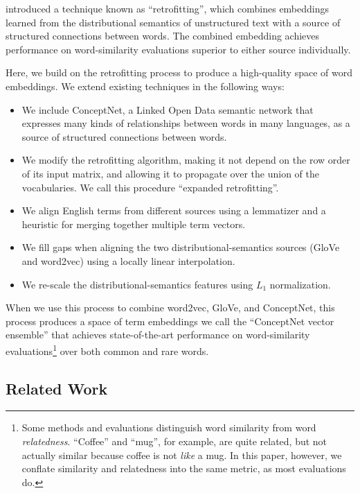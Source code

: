 \documentclass[11pt,letterpaper]{article}
\begin{document}
 introduced a technique
known as ``retrofitting'', which combines embeddings learned from the
distributional semantics of unstructured text with a source of structured
connections between words. The combined embedding achieves performance on
word-similarity evaluations superior to either source individually.

Here, we build on the retrofitting process to produce a high-quality space of
word embeddings. We extend existing techniques in the following ways:

\begin{itemize}
\item We include ConceptNet, a Linked Open Data semantic network that expresses
many kinds of relationships between words in many languages, as a source of
structured connections between words.
\item We modify the retrofitting algorithm, making it not depend on the row
order of its input matrix, and allowing it to propagate over the union of the
vocabularies. We call this procedure ``expanded retrofitting''.
\item We align English terms from different sources using a lemmatizer and a
heuristic for merging together multiple term vectors.
\item We fill gaps when aligning the two distributional-semantics sources
(GloVe and word2vec) using a locally linear interpolation.
\item We re-scale the distributional-semantics features using $L_1$ normalization.
\end{itemize}

When we use this process to combine word2vec, GloVe, and ConceptNet, this
process produces a space of term embeddings we call the ``ConceptNet vector
ensemble'' that achieves state-of-the-art performance on word-similarity
evaluations\footnote{Some methods and evaluations \cite{agirre2009similarity}
distinguish word similarity from word
{\em relatedness}. ``Coffee'' and ``mug'', for example, are quite related,
but not actually similar because coffee is not {\em like} a mug. In this paper,
however, we conflate similarity and relatedness into the same metric, as most
evaluations do.}
over both common and rare words.


\subsection{Related Work}

\end{document}
